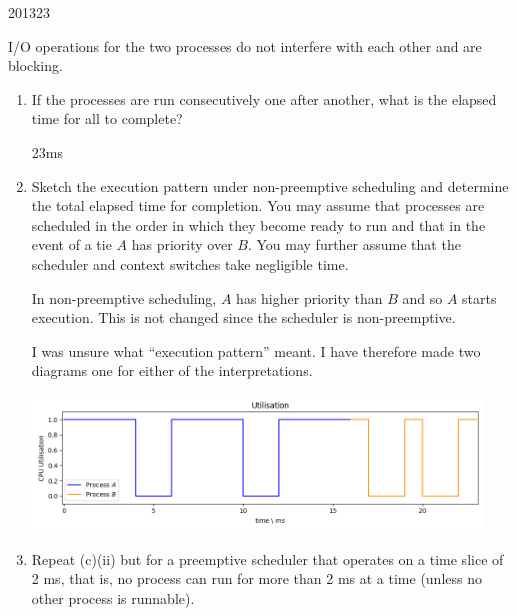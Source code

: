 \documentclass[10pt,\jkfside,a4paper]{article}
\begin{document}
\begin{examquestion}{2013}{2}{3}
\begin{enumerate}
I/O operations for the two processes do not interfere with each other and are
blocking.

\begin{enumerate}

\item  If the processes are run consecutively one after another, what is the elapsed
time for all to complete?

23ms

\item Sketch the execution pattern under non-preemptive scheduling and
determine the total elapsed time for completion. You may assume that
processes are scheduled in the order in which they become ready to run
and that in the event of a tie $A$ has priority over $B$. You may further
assume that the scheduler and context switches take negligible time.

In non-preemptive scheduling, $A$ has higher priority than $B$ and so $A$ 
starts execution. This is not changed since the scheduler is non-preemptive.

I was unsure what ``execution pattern'' meant. I have therefore made two diagrams 
one for either of the interpretations.

\begin{center}
\includegraphics[width=120mm]{utilisation}
\end{center}

\begin{center}
\end{center}

\item Repeat (c)(ii) but for a preemptive scheduler that operates on a time slice
of 2 ms, that is, no process can run for more than 2 ms at a time (unless
no other process is runnable).


\end{enumerate}
\end{enumerate}
\end{examquestion}
\end{document}
